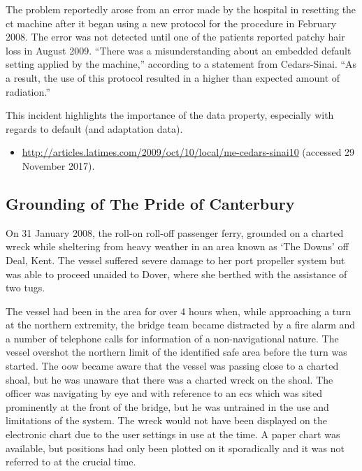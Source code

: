 The problem reportedly arose from an error made by the hospital in resetting the \gls{ct} machine after it began using a new protocol for the procedure in February 2008. The error was not detected until one of the patients reported patchy hair loss in August 2009. ``There was a misunderstanding about an embedded default setting applied by the machine,'' according to a statement from Cedars-Sinai. ``As a result, the use of this protocol resulted in a higher than expected amount of radiation.'' 

This incident highlights the importance of the  \gls{data property}, especially with regards to default (and \gls{adaptation data}).

\begin{samepage}
\begin{itemize}
  \item \raggedright{\href{http://articles.latimes.com/2009/oct/10/local/me-cedars-sinai10}{http://articles.latimes.com/2009/oct/10/local/me-cedars-sinai10} (accessed 29 November 2017).}
\end{itemize}
\end{samepage}


\subsection{Grounding of The Pride of Canterbury} \label{bkm:incacc:canterbury}
On 31 January 2008, the roll-on roll-off passenger ferry,  grounded on a charted wreck while sheltering from heavy weather in an area known as `The Downs' off Deal, Kent. The vessel suffered severe damage to her port propeller system but was able to proceed unaided to Dover, where she berthed with the assistance of two tugs.

The vessel had been in the area for over 4 hours when, while approaching a turn at the northern extremity, the bridge team became distracted by a fire alarm and a number of telephone calls for \gls{information} of a non-navigational nature. The vessel overshot the northern limit of the identified safe area before the turn was started. The \gls{oow} became aware that the vessel was passing close to a charted shoal, but he was unaware that there was a charted wreck on the shoal. The officer was navigating by eye and with reference to an \gls{ecs} which was sited prominently at the front of the bridge, but he was untrained in the use and limitations of the system. The wreck would not have been displayed on the electronic chart due to the user settings in use at the time. A paper chart was available, but positions had only been plotted on it sporadically and it was not referred to at the crucial time.


